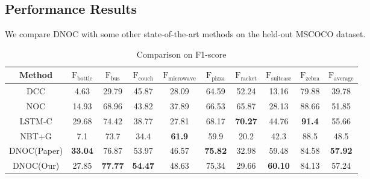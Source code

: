 \documentclass[a4paper, 11pt]{article} %
\begin{document}
\subsection{\textbf{Performance Results}}

We compare DNOC with some other state-of-the-art methods on the held-out MSCOCO dataset.

\begin{table}[H]
	\begin{center}
		\begin{tabular}{c|cccccccc|c}
			\toprule
			Method      & $\mathrm{F}_{\text{bottle}}$ & $\mathrm{F}_{\text{bus}}$ & $\mathrm{F}_{\text{couch}}$ & $\mathrm{F}_{\text{microwave}}$ & $\mathrm{F}_{\text{pizza}}$ & $\mathrm{F}_{\text{racket}}$ & $\mathrm{F}_{\text{suitcase}}$ & $\mathrm{F}_{\text{zebra}}$ & $\mathrm{F}_{\text{average}}$ \\
			\midrule
			DCC         & 4.63                         & 29.79                     & 45.87                       & 28.09                           & 64.59                       & 52.24                        & 13.16                          & 79.88                       & 39.78                         \\
			NOC         & 14.93                        & 68.96                     & 43.82                       & 37.89                           & 66.53                       & 65.87                        & 28.13                          & 88.66                       & 51.85                         \\
			LSTM-C      & 29.68                        & 74.42                     & 38.77                       & 27.81                           & 68.17                       & \textbf{70.27}               & 44.76                          & \textbf{91.4}               & 55.66                         \\
			NBT+G       & 7.1                          & 73.7                      & 34.4                        & \textbf{61.9}                   & 59.9                        & 20.2                         & 42.3                           & 88.5                        & 48.5                          \\
			\midrule
			DNOC(Paper) & \textbf{33.04}               & 76.87                     & 53.97                       & 46.57                           & \textbf{75.82}              & 32.98                        & 59.48                          & 84.58                       & \textbf{57.92}                \\
			DNOC(Our)   & 27.85                        & \textbf{77.77}            & \textbf{54.47}              & 48.63                           & 75,34                       & 29.66                        & \textbf{60.10}                 & 84.13                       & 57.24                         \\
			\bottomrule
		\end{tabular}
		\caption{Comparison on F1-score}
	\end{center}
\end{table}
\end{document}
